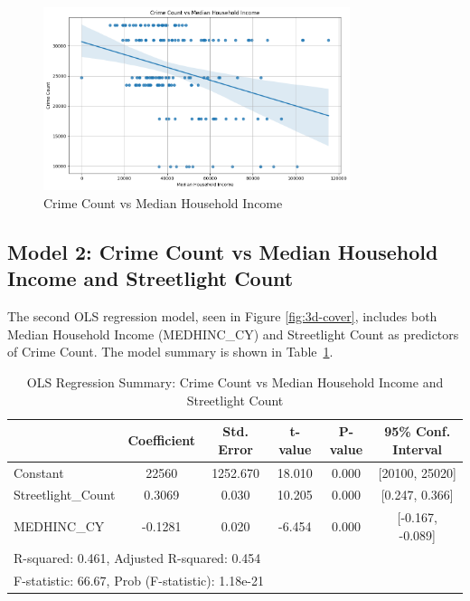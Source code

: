 \documentclass{report}
\begin{document}
\begin{figure}[htbp]
  \centering
  \includegraphics[width=0.8\textwidth]{crime-count-income.png}
  \caption{Crime Count vs Median Household Income}
  \label{fig:crime-count-income}
\end{figure}

\newpage
\subsection{Model 2: Crime Count vs Median Household Income and Streetlight Count}
The second OLS regression model, seen in Figure \ref{fig:3d-cover}, includes both Median Household Income (MEDHINC\_CY) and Streetlight Count as predictors of Crime Count. The model summary is shown in Table~\ref{tab:model2_summary}.

\begin{table}[htbp]
  \centering
  \caption{OLS Regression Summary: Crime Count vs Median Household Income and Streetlight Count}
  \label{tab:model2_summary}
  \begin{tabular}{lccccc}
    \toprule
    & Coefficient & Std. Error & t-value & P-value & 95\% Conf. Interval \\
    \midrule
    Constant & 22560 & 1252.670 & 18.010 & 0.000 & [20100, 25020] \\
    Streetlight\_Count & 0.3069 & 0.030 & 10.205 & 0.000 & [0.247, 0.366] \\
    MEDHINC\_CY & -0.1281 & 0.020 & -6.454 & 0.000 & [-0.167, -0.089] \\
    \midrule
    \multicolumn{6}{l}{R-squared: 0.461, Adjusted R-squared: 0.454} \\
    \multicolumn{6}{l}{F-statistic: 66.67, Prob (F-statistic): 1.18e-21} \\
    \bottomrule
  \end{tabular}
\end{table}
\end{document}
